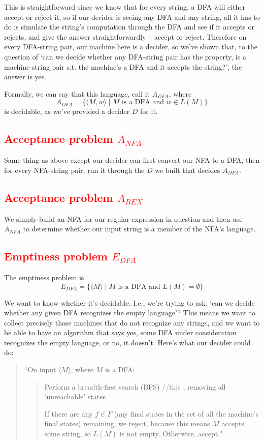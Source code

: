\documentclass[11pt]{article}
\begin{document}
This is straightforward since we know that for every string, a DFA will either accept or reject it, so if our decider is seeing any DFA and any string, all it has to do is simulate the string’s computation through the DFA and see if it accepts or rejects, and give the answer straightforwardly – accept or reject. Therefore on every DFA-string pair, our machine here is a decider, so we’ve shown that, to the question of ‘can we decide whether any DFA-string pair has the property, is a machine-string pair s.t. the machine’s a DFA and it accepts the string?’, the answer is yes.

Formally, we can say that this language, call it $A_{DFA}$, where
\[ A_{DFA} = \{\langle M, w\rangle \mid M \text{ is a DFA and } w \in L(M)\} \]
is decidable, as we've provided a decider $D$ for it.

\subsection{\textcolor{red}{Acceptance problem $A_{NFA}$}}
Same thing as above except our decider can first convert our NFA to a DFA, then for every NFA-string pair, run it through the $D$ we built that decides $A_{DFA}$.

\subsection{\textcolor{red}{Acceptance problem $A_{REX}$}}
We simply build an NFA for our regular expression in question and then use $A_{NFA}$ to determine whether our input string is a member of the NFA's language.

\subsection{\textcolor{red}{Emptiness problem $E_{DFA}$}}
The emptiness problem is 
\[E_{DFA} = \{\langle M \rangle \mid M \text{ is a DFA and } L(M) = \emptyset\}\]

We want to know whether it’s decidable. I.e., we’re trying to ask, ‘can we decide whether any given DFA recognizes the empty language’? This means we want to collect precisely those machines that do not recognize any strings, and we want to be able to have an algorithm that says yes, some DFA under consideration recognizes the empty language, or no, it doesn’t. Here’s what our decider could do:
\begin{quote}
“On input $\langle M \rangle$, where $M$ is a DFA:
\begin{quote}
Perform a breadth-first search (BFS) \textcolor{gray}{//this }, removing all `unreachable' states.

If there are any $f \in F$ (any final states in the set of all the machine's final states) remaining, we reject, because this means $M$ accepts some string, so $L(M)$ is not empty. Otherwise, accept."
\end{quote}
\end{quote}
\end{document}
